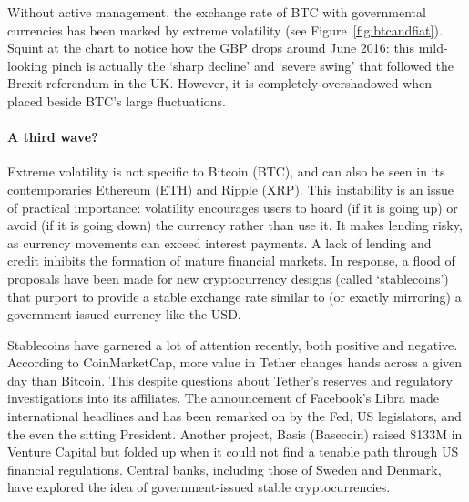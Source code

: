 Without active management, the exchange rate of BTC with governmental currencies has been marked by extreme volatility (see Figure~\ref{fig:btcandfiat}). Squint at the chart to notice how the GBP drops around June 2016: this mild-looking pinch is actually the  `sharp decline' and `severe swing' that followed the Brexit referendum in the UK. However, it is completely overshadowed when placed beside BTC's large fluctuations.

\paragraph{A third wave?} Extreme volatility is not specific to Bitcoin (BTC), and can also be seen in its contemporaries Ethereum (ETH) and Ripple (XRP). This instability is an issue of practical importance: volatility encourages users to hoard (if it is going up) or avoid (if it is going down) the currency rather than use it. It makes lending risky, as currency movements can exceed interest payments. A lack of lending and credit inhibits the formation of mature financial markets. In response, a flood of proposals have been made for new cryptocurrency designs (called `stablecoins') that purport to provide a stable exchange rate similar to (or exactly mirroring) a government issued currency like the USD.

Stablecoins have garnered a lot of attention recently, both positive and negative. According to CoinMarketCap, more value in Tether changes hands across a given day than Bitcoin. This despite questions about Tether's reserves and regulatory investigations into its affiliates. The announcement of Facebook's Libra made international headlines and has been remarked on by the Fed, US legislators, and the even the sitting President. Another project, Basis (\nee Basecoin) raised \$133M in Venture Capital but folded up when it could not find a tenable path through US financial regulations. Central banks, including those of Sweden and Denmark, have explored the idea of government-issued stable cryptocurrencies.

